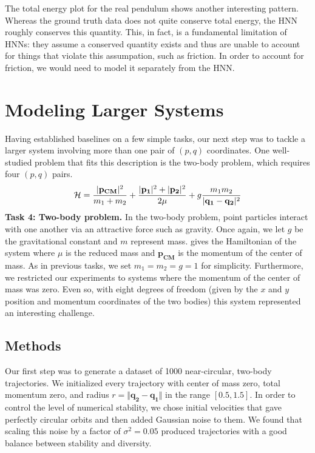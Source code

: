 \documentclass{article}
\begin{document}
The total energy plot for the real pendulum shows another interesting pattern. Whereas the ground truth data does not quite conserve total energy, the HNN roughly conserves this quantity. This, in fact, is a fundamental limitation of HNNs: they assume a conserved quantity exists and thus are unable to account for things that violate this assumpation, such as friction. In order to account for friction, we would need to model it separately from the HNN.

\section{Modeling Larger Systems}  

Having established baselines on a few simple tasks, our next step was to tackle a larger system involving more than one pair of $(p,q)$ coordinates. One well-studied problem that fits this description is the two-body problem, which requires four $(p,q)$ pairs.
\begin{equation}
\mathcal{H} = \frac{|\mathbf{p_{CM}}|^2}{m_1 + m_2} + \frac{|\mathbf{p_1}|^2 + |\mathbf{p_2}|^2}{2\mu} + g\frac{m_1m_2}{|\mathbf{q_1}-\mathbf{q_2}|^2}
\eqnlabel{eqn6}
\end{equation}
\textbf{Task 4: Two-body problem.} In the two-body problem, point particles interact with one another via an attractive force such as gravity. Once again, we let $g$ be the gravitational constant and $m$ represent mass.  gives the Hamiltonian of the system where $\mu$ is the reduced mass and $\mathbf{p_{CM}}$ is the momentum of the center of mass. As in previous tasks, we set $m_1=m_2=g=1$ for simplicity. Furthermore, we restricted our experiments to systems where the momentum of the center of mass was zero. Even so, with eight degrees of freedom (given by the $x$ and $y$ position and momentum coordinates of the two bodies) this system represented an interesting challenge.

\subsection{Methods} 
Our first step was to generate a dataset of 1000 near-circular, two-body trajectories. We initialized every trajectory with center of mass zero, total momentum zero, and radius $r=\Vert \mathbf{q_2}-\mathbf{q_1} \Vert$ in the range $[0.5,1.5]$. In order to control the level of numerical stability, we chose initial velocities that gave perfectly circular orbits and then added Gaussian noise to them. We found that scaling this noise by a factor of $\sigma^2=0.05$ produced trajectories with a good balance between stability and diversity.
\end{document}
